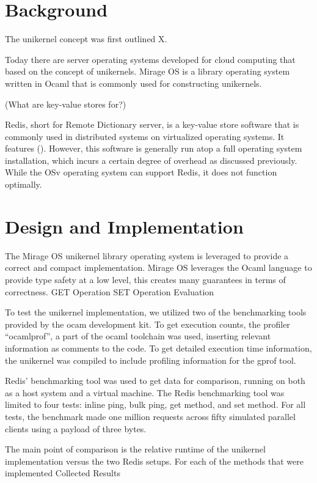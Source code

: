\documentclass[english,10pt,twocolumn]{article}
\begin{document}
\section{Background}
The unikernel concept was first outlined X.

Today there are server operating systems developed for cloud computing that based on the concept of unikernels. Mirage OS is a library operating system written in Ocaml that is commonly used for constructing unikernels.

(What are key-value stores for?) 

Redis, short for Remote Dictionary server, is a key-value store software that is commonly used in distributed systems on virtualized operating systems. It features (). However, this software is generally run atop a full operating system installation, which incurs a certain degree of overhead as discussed previously.  While the OSv operating system can support Redis, it does not function optimally.

\section{Design and Implementation}

The Mirage OS unikernel library operating system is leveraged to provide a correct and compact implementation. Mirage OS leverages the Ocaml language to provide type safety at a low level, this creates many guarantees in terms of correctness.
GET Operation
SET Operation
Evaluation

To test the unikernel implementation, we utilized two of the benchmarking tools provided by the  ocam development kit. To get execution counts, the profiler “ocamlprof”, a part of the ocaml toolchain was used, inserting relevant information as comments to the code. To get detailed execution time information, the unikernel was compiled to include profiling information for the gprof tool.

Redis’ benchmarking tool was used to get data for comparison, running on both as a host system and a virtual machine. The Redis benchmarking tool was limited to four tests: inline ping, bulk ping, get method, and set method. For all tests, the benchmark made one million requests across fifty simulated parallel clients using a payload of three bytes.

The main point of comparison is the relative runtime of the unikernel implementation versus the two Redis setups. For each of the methods that were implemented
Collected Results
\end{document}
